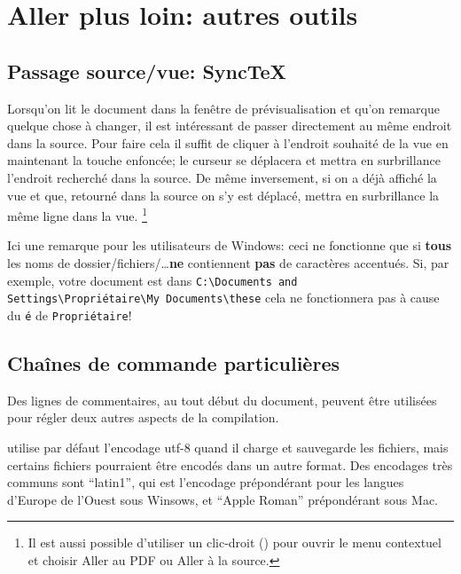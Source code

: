 
\chapter{Aller plus loin: autres outils}

\section{Passage source/vue: SyncTeX}
\label{sec.synctex}

Lorsqu'on lit le  document dans la fenêtre de prévisualisation et qu'on remarque quelque chose à changer, il est intéressant de passer directement au même endroit dans la source. Pour faire cela il suffit de cliquer à l'endroit souhaité de la vue en maintenant la touche  enfoncée; le curseur se déplacera et mettra en surbrillance l'endroit recherché dans la source. De même inversement, si on a déjà affiché la vue et que, retourné dans la source on s'y est déplacé,  mettra en surbrillance la même ligne dans la vue. \footnote{Il est aussi possible d'utiliser un clic-droit () pour ouvrir le menu contextuel et choisir \og{}Aller au PDF\fg{} ou \og{}Aller à la source\fg.}

\begin{OSWindows}
Ici une remarque pour les utilisateurs de Windows: ceci ne fonctionne que si \textbf{tous} les noms de dossier/fichiers/\dots \textbf{ne} contiennent \textbf{pas} de caractères accentués. Si, par exemple, votre document est dans \texttt{C:\textbackslash Documents and Settings\textbackslash Propriétaire\textbackslash My Documents\textbackslash these} cela ne fonctionnera pas à cause du \verb|é| de \texttt{Propriétaire}!
\end{OSWindows}

\section{Chaînes de commande particulières}

Des lignes de commentaires, au tout début du document, peuvent être utilisées pour régler deux autres aspects de la compilation. 

\Tw{} utilise par défaut l'encodage \og utf-8\fg{} quand il charge et sauvegarde les fichiers, mais certains fichiers pourraient être encodés dans un autre format. Des encodages très communs sont ``latin1'', qui est l'encodage prépondérant pour les langues d'Europe de l'Ouest sous Winsows, et ``Apple Roman'' prépondérant sous Mac.

